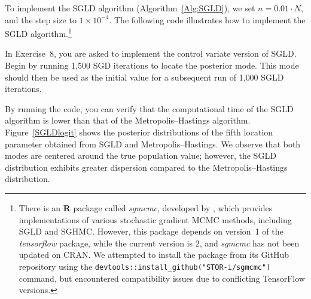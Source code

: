 To implement the SGLD algorithm (Algorithm~\ref{Alg:SGLD}), we set \( n = 0.01 \cdot N \), and the step size to \( 1 \times 10^{-4} \). The following code illustrates how to implement the SGLD algorithm.\footnote{There is an \textbf{R} package called \textit{sgmcmc}, developed by \cite{baker2019sgmcmc}, which provides implementations of various stochastic gradient MCMC methods, including SGLD and SGHMC. However, this package depends on version~1 of the \textit{tensorflow} package, while the current version is 2, and \textit{sgmcmc} has not been updated on CRAN. We attempted to install the package from its GitHub repository using the \texttt{devtools::install\_github("STOR-i/sgmcmc")} command, but encountered compatibility issues due to conflicting TensorFlow versions.} 

In Exercise~8, you are asked to implement the control variate version of SGLD. Begin by running 1{,}500 SGD iterations to locate the posterior mode. This mode should then be used as the initial value for a subsequent run of 1{,}000 SGLD iterations.

By running the code, you can verify that the computational time of the SGLD algorithm is lower than that of the Metropolis–Hastings algorithm. Figure~\ref{SGLDlogit} shows the posterior distributions of the fifth location parameter obtained from SGLD and Metropolis–Hastings. We observe that both modes are centered around the true population value; however, the SGLD distribution exhibits greater dispersion compared to the Metropolis–Hastings distribution.


